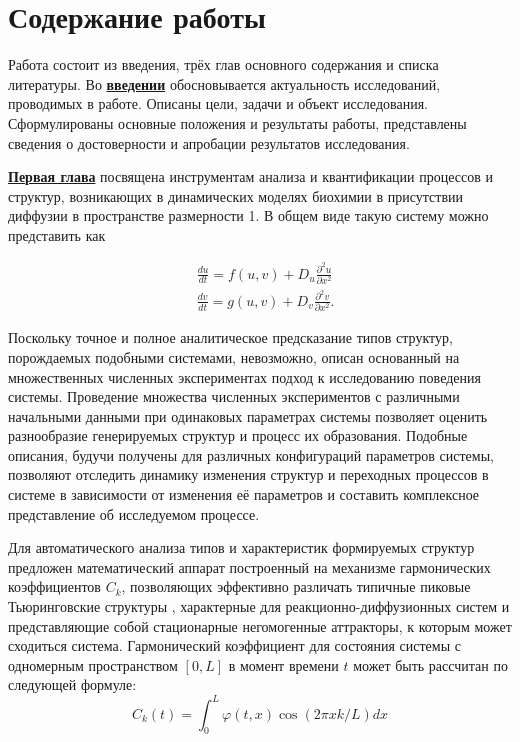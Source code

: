 \section*{Содержание работы}
Работа состоит из введения, трёх глав основного содержания и списка литературы. 
Во \underline{\textbf{введении}} обосновывается актуальность
исследований, проводимых в работе. Описаны цели, задачи и объект исследования. 
Сформулированы основные положения и результаты работы,
представлены сведения о достоверности и апробации результатов исследования. 

\underline{\textbf{Первая глава}} посвящена инструментам анализа и квантификации процессов и структур, возникающих в динамических моделях биохимии в присутствии диффузии в пространстве размерности 1. В общем виде такую систему можно представить как

\begin{equation}
    \begin{aligned}
        & \frac{d u}{d t}=f(u,v)+D_u \frac{\partial^2 u}{\partial x^2} \\
        & \frac{d v}{d t}=g(u,v)+D_v \frac{\partial^2 v}{\partial x^2} .
        \end{aligned}
    \label{eq:generic_system}
\end{equation}

Поскольку точное и полное аналитическое предсказание типов структур, порождаемых подобными системами, невозможно, описан основанный на множественных численных экспериментах подход к исследованию поведения системы. Проведение множества численных экспериментов с различными начальными данными при одинаковых параметрах системы позволяет оценить разнообразие генерируемых структур и процесс их образования. Подобные описания, будучи получены для различных конфигураций параметров системы, позволяют отследить динамику изменения структур и переходных процессов в системе в зависимости от изменения её параметров и составить комплексное представление об исследуемом процессе.

Для автоматического анализа типов и характеристик формируемых структур предложен математический аппарат построенный на механизме гармонических коэффициентов $C_k$, позволяющих эффективно различать типичные пиковые Тьюринговские структуры \cite{turing1990chemical}, характерные для реакционно-диффузионных систем и представляющие собой стационарные негомогенные аттракторы, к которым может сходиться система. Гармонический коэффициент для состояния системы с одномерным пространством $[0, L]$ в момент времени $t$ может быть рассчитан по следующей формуле:
\begin{equation}
    C_k(t) = \int_0^L \varphi(t, x) \cos (2 \pi x k / L) d x
\end{equation}

